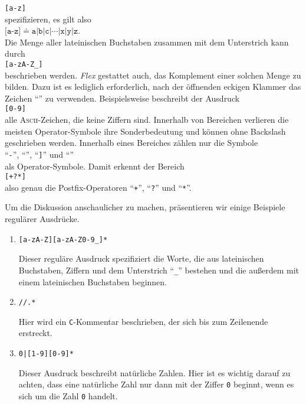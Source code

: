 \hspace*{1.3cm}
\texttt{[a-z]}
\\[0.2cm]
spezifizieren, es gilt also
\\[0.2cm]
\hspace*{1.3cm}
$\texttt{[a-z]} \doteq \texttt{a|b|c|$\cdots$|x|y|z}$.
\\[0.2cm]
Die Menge aller lateinischen Buchstaben zusammen mit dem Unterstrich
kann durch
\\[0.2cm]
\hspace*{1.3cm}
\texttt{[a-zA-Z\_]}
\\[0.2cm]
beschrieben werden.  \textsl{Flex} gestattet auch, das Komplement einer solchen Menge zu bilden.
Dazu ist es lediglich erforderlich, nach der \"offnenden eckigen Klammer das Zeichen
``\texttt{}'' zu verwenden.  Beispielsweise beschreibt der Ausdruck
\\[0.2cm]
\hspace*{1.3cm}
\texttt{[0-9]}
\\[0.2cm]
alle \textsc{Ascii}-Zeichen, die keine Ziffern sind.  Innerhalb von Bereichen verlieren 
die meisten Operator-Symbole ihre Sonderbedeutung und k\"onnen ohne Backslash geschrieben
werden.  Innerhalb eines Bereiches z\"ahlen nur die Symbole
\\[0.2cm]
\hspace*{1.3cm}
``\texttt{-}'', ``\texttt{}'', ``\texttt{]}'' und ``\texttt{}''
\\[0.2cm]
als Operator-Symbole.  Damit erkennt der Bereich
\\[0.2cm]
\hspace*{1.3cm}
\texttt{[+?*]}
\\[0.2cm]
also genau die Postfix-Operatoren ``\texttt{+}'', ``\texttt{?}'' und ``\texttt{*}''.

\examples
Um die Diskussion anschaulicher zu machen, pr\"asentieren wir einige Beispiele regul\"arer Ausdr\"ucke.
\begin{enumerate}
\item \texttt{[a-zA-Z][a-zA-Z0-9\_]*}

      Dieser regul\"are Ausdruck spezifiziert die Worte, die aus lateinischen Buchstaben, Ziffern und
      dem Unterstrich ``\texttt{\_}'' bestehen und die au{\ss}erdem mit einem lateinischen 
      Buchstaben beginnen.
\item \texttt{//.*}

      Hier wird ein \texttt{C}-Kommentar beschrieben, der sich bis zum Zeilenende erstreckt.
\item \texttt{0|[1-9][0-9]*}

      Dieser Ausdruck beschreibt nat\"urliche Zahlen.  Hier ist es wichtig darauf zu achten,
      dass eine nat\"urliche Zahl nur dann mit der Ziffer \texttt{0} beginnt, wenn es sich um die
      Zahl \texttt{0} handelt.
\end{enumerate}

